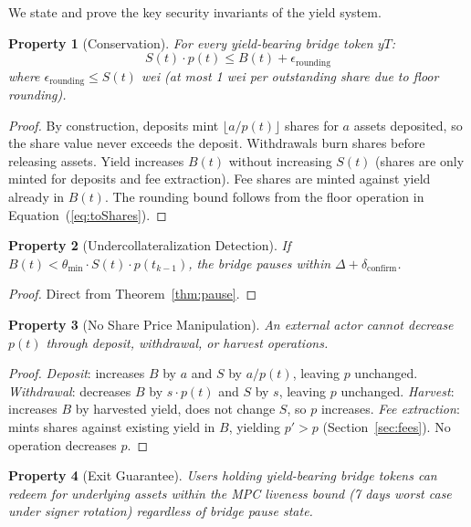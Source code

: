 \documentclass[11pt,twocolumn]{article}
\newtheorem{property}{Property}[section]
\begin{document}
We state and prove the key security invariants of the yield system.

\begin{property}[Conservation]\label{prop:conservation}
For every yield-bearing bridge token $yT$:
\begin{equation}
  S(t) \cdot p(t) \leq B(t) + \epsilon_{\text{rounding}}
\end{equation}
where $\epsilon_{\text{rounding}} \leq S(t)$ wei (at most 1 wei per outstanding share due to floor rounding).
\end{property}

\begin{proof}
By construction, deposits mint $\lfloor a / p(t) \rfloor$ shares for $a$ assets deposited, so the share value never exceeds the deposit. Withdrawals burn shares before releasing assets. Yield increases $B(t)$ without increasing $S(t)$ (shares are only minted for deposits and fee extraction). Fee shares are minted against yield already in $B(t)$. The rounding bound follows from the floor operation in Equation~(\ref{eq:toShares}).
\end{proof}

\begin{property}[Undercollateralization Detection]
If $B(t) < \theta_{\min} \cdot S(t) \cdot p(t_{k-1})$, the bridge pauses within $\Delta + \delta_{\text{confirm}}$.
\end{property}

\begin{proof}
Direct from Theorem~\ref{thm:pause}.
\end{proof}

\begin{property}[No Share Price Manipulation]
An external actor cannot decrease $p(t)$ through deposit, withdrawal, or harvest operations.
\end{property}

\begin{proof}
\textit{Deposit}: increases $B$ by $a$ and $S$ by $a/p(t)$, leaving $p$ unchanged.
\textit{Withdrawal}: decreases $B$ by $s \cdot p(t)$ and $S$ by $s$, leaving $p$ unchanged.
\textit{Harvest}: increases $B$ by harvested yield, does not change $S$, so $p$ increases.
\textit{Fee extraction}: mints shares against existing yield in $B$, yielding $p' > p$ (Section~\ref{sec:fees}).
No operation decreases $p$.
\end{proof}

\begin{property}[Exit Guarantee]
Users holding yield-bearing bridge tokens can redeem for underlying assets within the MPC liveness bound (7 days worst case under signer rotation) regardless of bridge pause state.
\end{property}
\end{document}

